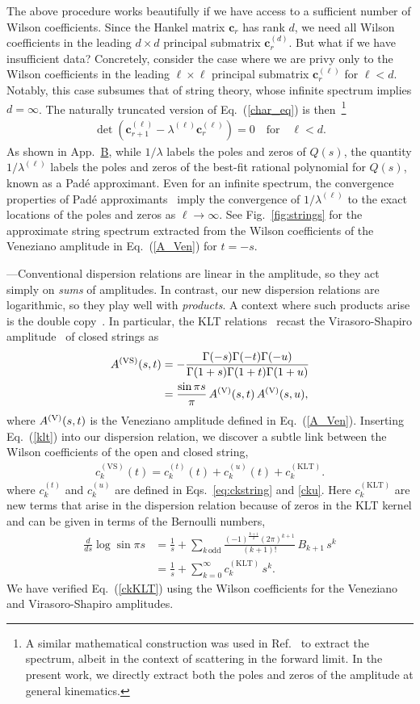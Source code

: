 \documentclass[twocolumn,english,aps,prd,reprint,floatfix,notitlepage,footinbib,preprintnumbers,superscriptaddress,longbibliography]{revtex4-1}
\newcommand{\be}{\begin{equation}}
\newcommand{\ee}{\end{equation}}
\newcommand{\Fig}[1]{Fig.~\ref{#1}}
\newcommand{\Eq}[1]{Eq.~(\ref{#1})}
\newcommand{\eq}[2]{\be\begin{aligned}#1 \label{#2}\end{aligned}\ee}
\newcommand{\mysec}[1]{\noindent {\bf #1.}---}
\begin{document}
The above procedure works beautifully if we have access to a sufficient number of Wilson coefficients.  Since the Hankel matrix $\boldsymbol{c}_{r}$ has rank $d$, we need all Wilson coefficients in the leading $d \times d$ principal submatrix $\boldsymbol{c}_{r}^{(d)}$.  But what if we have insufficient data?  Concretely, consider the case where we are privy only to the Wilson coefficients in the leading $\ell\times \ell$ principal submatrix $\boldsymbol{c}_{r}^{(\ell)}$ for $\ell < d$.  Notably, this case subsumes that of string theory, whose infinite spectrum implies $d=\infty$.
The naturally truncated version of \Eq{char_eq} is then~\footnote{A similar mathematical construction was used in Ref.~\cite{Bellazzini:2020cot} to extract the spectrum, albeit in the context of scattering in the forward limit.  In the present work, we directly extract both the poles and zeros of the amplitude at general kinematics.}
\eq{
\det\left({\boldsymbol{c}}_{r+1}^{(\ell)} -  \lambda^{(\ell)} {\boldsymbol{c}}_r^{(\ell)}\right) = 0 \quad \textrm{for} \quad \ell <d.
}{char_eq_trunc}
As shown in App.~\hyperref[pade]{B}, while $1/\lambda$ labels the poles and zeros of $Q(s)$, the quantity $1/\lambda^{(\ell)}$ labels the poles and zeros of the best-fit rational polynomial for $Q(s)$, known as a Pad\'e approximant.  Even for an infinite spectrum, the convergence properties of Pad\'e approximants~\cite{Nuttall} imply the convergence of $1/ \lambda^{(\ell)}$ to the exact locations of the poles and zeros as $\ell\rightarrow\infty$.
See \Fig{fig:strings} for the approximate string spectrum extracted from the Wilson coefficients of the Veneziano amplitude in \Eq{A_Ven} for $t=-s$.

\medskip
\mysec{Double Copy}Conventional dispersion relations are linear in the amplitude, so they act simply on {\it sums} of amplitudes.  In contrast, our new dispersion relations are logarithmic, so they play well with {\it products}.  A context where such products arise is the double copy~\cite{Bern:2019prr}.  In particular, the KLT relations~\cite{KLT} recast the Virasoro-Shapiro amplitude~\cite{Virasoro,Shapiro} of closed strings as
\eq{
A^{(\rm VS)}(s,t)&= -\frac{\Gamma(-s)\Gamma(-t)\Gamma(-u)}{\Gamma(1+s)\Gamma(1+t)\Gamma(1+u)} \\
&=\frac{\sin \pi s}{\pi}\,A^{(\rm V)}(s,t)\,A^{(\rm V)}(s,u),
}{klt}
where $A^{(\rm V)}(s,t)$ is the Veneziano amplitude defined in \Eq{A_Ven}.
Inserting \Eq{klt} into  our dispersion relation, we discover a subtle link between the Wilson coefficients of the open and closed string,
\eq{
c_k^{(\mathrm{VS})}(t)=c_k^{(t)}(t)+c_k^{(u)}(t)+c_k^{(\mathrm{KLT})}.
}{ckKLT}
where $c_k^{(t)}$ and $c_k^{(u)}$ are defined in Eqs.~\eqref{eq:ckstring} and \eqref{cku}.
Here $c_k^{(\mathrm{KLT})}$ are new terms that arise in the dispersion relation because of zeros in the KLT kernel and can be given in terms of the Bernoulli numbers,
\eq{
\frac{d}{ds} \log \sin \pi s
& =
\frac{1}{s}
+
\sum_{k\,\mathrm{odd}}
\frac{(-1)^{\frac{k+1}{2}}(2\pi)^{k+1}}{(k+1)!}\,B_{k+1}\,s^k \\ &
=
\frac{1}{s}
+
\sum_{k=0}^{\infty} c_k^{(\mathrm{KLT})}\,s^k.
}{}
We have verified \Eq{ckKLT} using the Wilson coefficients for the Veneziano and Virasoro-Shapiro amplitudes.
\end{document}
